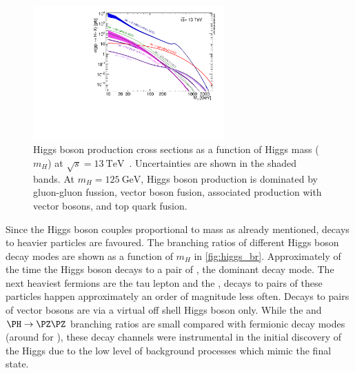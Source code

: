 \begin{figure}[!htbp]
  \centering
  \includegraphics[width=0.65\textwidth]{chapters/1.theory/figs/plotAll_13tev_BSM_sqrt.pdf}
  \caption{
    Higgs boson production cross sections as a function of Higgs mass ($m_H$) at $\sqrt{s} = \SI{13}{\TeV}$~\cite{deFlorian:2016spz}.
    Uncertainties are shown in the shaded bands.
    At $m_H = \SI{125}{\GeV}$, Higgs boson production is dominated by gluon-gluon fussion, vector boson fusion, associated production with vector bosons, and top quark fusion.
  }
  \label{fig:higgs_production_xs}
\end{figure}

Since the Higgs boson couples proportional to mass as already mentioned, decays to heavier particles are favoured.
The branching ratios of different Higgs boson decay modes are shown as a function of $m_H$ in \cref{fig:higgs_br}.
Approximately  of the time the Higgs boson decays to a pair of \bquarks, the dominant decay mode.%
The next heaviest fermions are the tau lepton and the \cquark, decays to pairs of these particles happen approximately an order of magnitude less often.
Decays to pairs of vector bosons are via a virtual off shell Higgs boson only.%
While the \Hgammagamma and $\PH \rightarrow \Zboson \Zboson$ branching ratios are small compared with fermionic decay modes (around  for \Hgammagamma), these decay channels were instrumental in the initial discovery of the Higgs due to the low level of background processes which mimic the final state.

